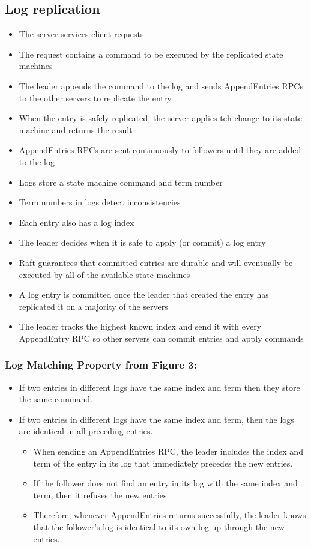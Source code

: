\documentclass[10pt,a4paper]{article}
\begin{document}
	\subsection{Log replication}
	\begin{itemize}
		\item The server services client requests
		\item The request contains a command to be executed by the replicated state machines
		\item The leader appends the command to the log and sends AppendEntries RPCs to the other servers to replicate the entry
		\item When the entry is safely replicated, the server applies teh change to its state machine and returns the result
		\item AppendEntries RPCs are sent continuously to followers until they are added to the log
		\item Logs store a state machine command and term number
		\item Term numbers in logs detect inconsistencies
		\item Each entry also has a log index
		\item The leader decides when it is safe to apply (or commit) a log entry
		\item Raft guarantees that committed entries are durable and will eventually be executed by all of the available state machines
		\item A log entry is committed once the leader that created the entry has replicated it on a majority of the servers
		\item The leader tracks the highest known index and send it with every AppendEntry RPC so other servers can commit entries and apply commands
	\end{itemize}
	\subsubsection{Log Matching Property from Figure 3:}
	\begin{itemize}
		\item If two entries in different logs have the same index and term then they store the same command.
		\item If two entries in different logs have the same index and term, then the logs are identical in all preceding entries.
		\begin{itemize}
			\item When sending an AppendEntries RPC, the leader includes the index and term of the entry in its log that immediately precedes the new entries. 
			\item If the follower does not find an entry in its log with the same index and term, then it refuses the new entries. 
			\item Therefore, whenever AppendEntries returns successfully, the leader knows that the follower’s log is identical to its own log up through the new entries.
		\end{itemize}
	\end{itemize}
\end{document}

